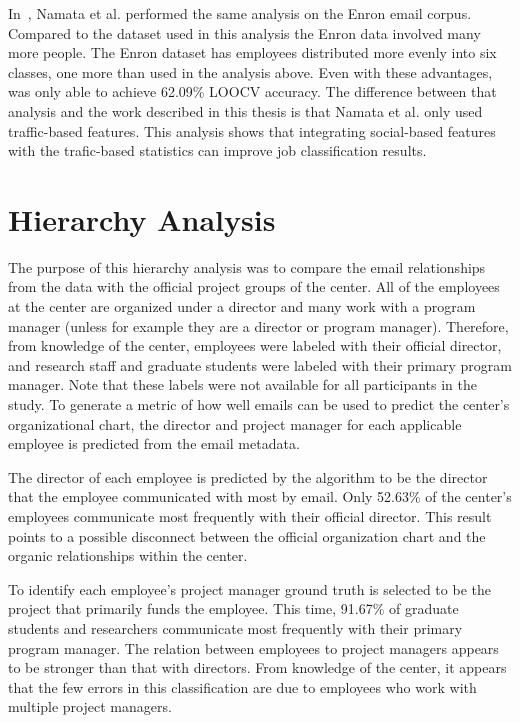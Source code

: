 \documentclass[12pt]{report}
\begin{document}
In~\cite{namata_inferring_2006}, Namata et al. performed the same analysis on the Enron email corpus.
Compared to the dataset used in this analysis the Enron data involved many more people.
The Enron dataset has employees distributed more evenly into six classes, one more than used in the analysis above.
Even with these advantages, \cite{namata_inferring_2006} was only able to achieve 62.09\% LOOCV accuracy.
The difference between that analysis and the work described in this thesis is that Namata et al. only used traffic-based features.
This analysis shows that integrating social-based features with the trafic-based statistics can improve job classification results.

\section{Hierarchy Analysis}
The purpose of this hierarchy analysis was to compare the email relationships from the data with the official project groups of the center.
All of the employees at the center are organized under a director and many work with a program manager (unless for example they are a director or program manager).
Therefore, from knowledge of the center, employees were labeled with their official director, and research staff and graduate students were labeled with their primary program manager.
Note that these labels were not available for all participants in the study.
To generate a metric of how well emails can be used to predict the center's organizational chart, the director and project manager for each applicable employee is predicted from the email metadata. 

The director of each employee is predicted by the algorithm to be the director that the employee communicated with most by email.
Only 52.63\% of the center's employees communicate most frequently with their official director.
This result points to a possible disconnect between the official organization chart and the organic relationships within the center.

To identify each employee's project manager ground truth is selected to be the project that primarily funds the employee.
This time, 91.67\% of graduate students and researchers communicate most frequently with their primary program manager.
The relation between employees to project managers appears to be stronger than that with directors.
From knowledge of the center, it appears that the few errors in this classification are due to employees who work with multiple project managers.  
\end{document}
